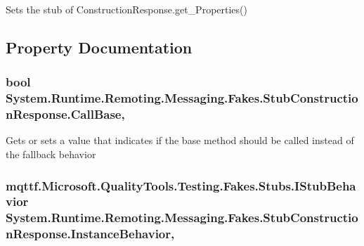 Sets the stub of Construction\-Response.\-get\-\_\-\-Properties()



\subsection{Property Documentation}
\hypertarget{class_system_1_1_runtime_1_1_remoting_1_1_messaging_1_1_fakes_1_1_stub_construction_response_a48b8407cd7a06ed5d88c3147a9b7c9b7}{
\subsubsection[{Call\-Base}]{\setlength{\rightskip}{0pt plus 5cm}bool System.\-Runtime.\-Remoting.\-Messaging.\-Fakes.\-Stub\-Construction\-Response.\-Call\-Base\hspace{0.3cm}{\ttfamily [get]}, {\ttfamily [set]}}}\label{class_system_1_1_runtime_1_1_remoting_1_1_messaging_1_1_fakes_1_1_stub_construction_response_a48b8407cd7a06ed5d88c3147a9b7c9b7}


Gets or sets a value that indicates if the base method should be called instead of the fallback behavior

\hypertarget{class_system_1_1_runtime_1_1_remoting_1_1_messaging_1_1_fakes_1_1_stub_construction_response_ad338b0b0513d66040298a1956929a83f}{
\subsubsection[{Instance\-Behavior}]{\setlength{\rightskip}{0pt plus 5cm}mqttf.\-Microsoft.\-Quality\-Tools.\-Testing.\-Fakes.\-Stubs.\-I\-Stub\-Behavior System.\-Runtime.\-Remoting.\-Messaging.\-Fakes.\-Stub\-Construction\-Response.\-Instance\-Behavior\hspace{0.3cm}{\ttfamily [get]}, {\ttfamily [set]}}}\label{class_system_1_1_runtime_1_1_remoting_1_1_messaging_1_1_fakes_1_1_stub_construction_response_ad338b0b0513d66040298a1956929a83f}


